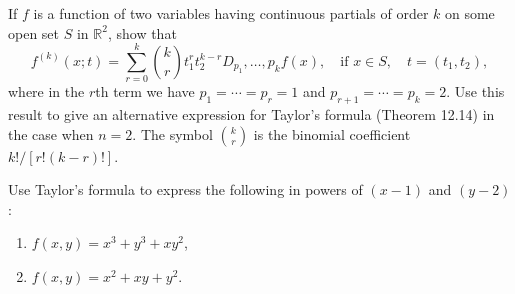 \begin{problembox}
If \( f \) is a function of two variables having continuous partials of order \( k \) on some open set \( S \) in \( \mathbb{R}^2 \), show that
\[f^{(k)} (x; t) = \sum_{r=0}^{k} \binom{k}{r} t_1^r t_2^{k-r} D_{p_1}, \ldots, p_k f(x), \quad \text{if } x \in S, \quad t = (t_1, t_2),\]
where in the \( r \)th term we have \( p_1 = \cdots = p_r = 1 \) and \( p_{r+1} = \cdots = p_k = 2 \). Use this result to give an alternative expression for Taylor's formula (Theorem 12.14) in the case when \( n = 2 \). The symbol \( \binom{k}{r} \) is the binomial coefficient \( k! / [r! (k - r)!] \).
\end{problembox}

\begin{problembox}
Use Taylor's formula to express the following in powers of \( (x - 1) \) and \( (y - 2) \):
\begin{enumerate}[label=(\alph*)]
\item \( f(x, y) = x^3 + y^3 + xy^2 \),
\item \( f(x, y) = x^2 + xy + y^2 \).
\end{enumerate}
\end{problembox}